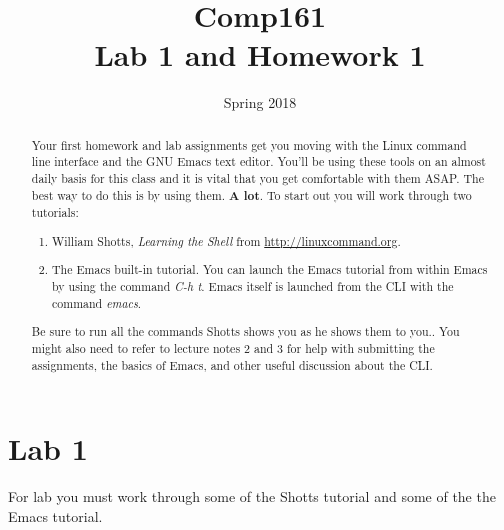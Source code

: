 \documentclass[nobib]{tufte-handout}
\title{Comp161 \\ Lab 1 and Homework 1}
\author{}
\date{ Spring 2018 }
\begin{document}
\maketitle

\begin{abstract}
Your first homework and lab assignments get you moving with the Linux command line interface and the GNU Emacs text editor.  You'll be using these tools on an almost daily basis for this class and it is vital that you get comfortable with them ASAP\@. The best way to do this is by using them.  \textbf{A lot}. To start out you will work through two tutorials:
\begin{enumerate}
\item William Shotts, \textit{Learning the Shell} from \url{http://linuxcommand.org}.
\item The Emacs built-in tutorial. You can launch the Emacs tutorial from within Emacs by using the command \textit{C-h t}.  Emacs itself is launched from the CLI with the command \textit{emacs}.
\end{enumerate}
Be sure to run all the commands Shotts shows you as he shows them to you..  You might also need to refer to lecture notes 2 and 3 for help with submitting the assignments, the basics of Emacs, and other useful discussion about the CLI\@.
\end{abstract}


\section{Lab 1}

For lab you must work through some of the  Shotts tutorial and some of the the Emacs tutorial.
\end{document}

